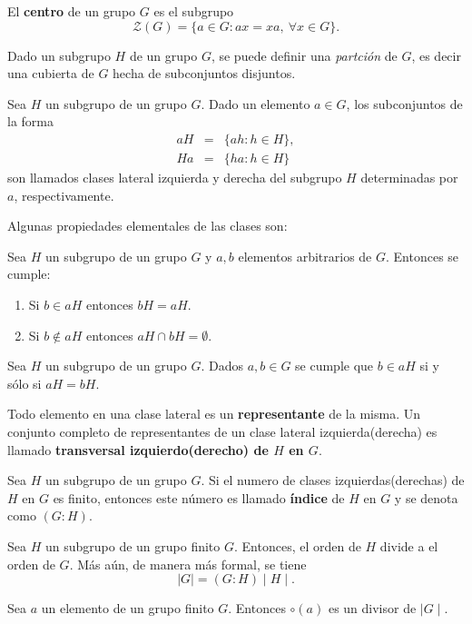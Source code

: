  \begin{definicion}
 El \textbf{centro} de un grupo $G$ es el subgrupo \[ \mathcal{Z}(G) = \{ a \in G \colon ax=xa, \ \forall  x \in G \}. \]
 \end{definicion}
Dado un subgrupo $H$ de un grupo $G$, se puede definir una \textit{partción} de $G$, es decir una cubierta de $G$ hecha de subconjuntos disjuntos. 
\begin{definicion}
Sea $H$ un subgrupo de un grupo $G$. Dado un elemento $a \in G$, los subconjuntos de la forma 
\begin{eqnarray*}
aH &=& \{ ah \colon h \in H \}, \\
Ha &=& \{ ha \colon h \in H \} 
\end{eqnarray*}
son llamados  clases lateral izquierda y derecha del subgrupo $H$ determinadas por $a$, respectivamente.
\end{definicion}
Algunas propiedades elementales de las clases son:
\begin{proposicion}
Sea $H$ un subgrupo de un grupo $G$ y $a,b$ elementos arbitrarios de $G$. Entonces se cumple:
\begin{enumerate}
\item Si $b \in aH$ entonces $bH = aH$.
\item Si $b \notin aH$ entonces $aH \cap bH = \emptyset$.
\end{enumerate}
\end{proposicion}
\begin{corolario}
Sea $H$ un subgrupo de un grupo $G$. Dados $a,b \in G$ se cumple que $b \in aH$ si y sólo si $aH = bH$.
\end{corolario}
Todo elemento en una clase lateral es un \textbf{representante} de la misma. Un conjunto completo de representantes de un clase lateral izquierda(derecha) es llamado \textbf{transversal izquierdo(derecho) de $H$ en $G$}.
\begin{definicion}
Sea $H$ un subgrupo de un grupo $G$. Si el numero de clases izquierdas(derechas) de $H$ en $G$ es finito, entonces este número es llamado  \textbf{índice} de $H$ en $G$ y se denota como $(G\colon H)$.
\end{definicion}
\begin{teorema}[Lagrange]
Sea $H$ un subgrupo de un grupo finito $G$. Entonces, el orden de $H$ divide a el orden de $G$. Más aún, de manera más formal, se tiene
\[ \mid G \mid = (G \colon H) \mid H \mid. \]
\end{teorema}
\begin{corolario}
Sea $a$ un elemento de un grupo finito $G$. Entonces $\circ(a)$ es un divisor de $\mid G \mid$.
\end{corolario}
